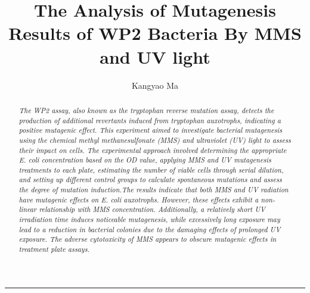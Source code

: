 \documentclass[a4paper,10pt]{article}
\title{\bfseries The Analysis of Mutagenesis Results of WP2 Bacteria By MMS and UV light}
\author{Kangyao Ma}
\date{}
\begin{document}
\maketitle


\setlength{\absleftindent}{0pt}
\setlength{\absrightindent}{0pt}
\setlength{\abstitleskip}{-1.5em}
\abslabeldelim{:}
\renewcommand{\abstractnamefont}{\itshape\bfseries}
\renewcommand{\absnamepos}{flushleft}
\begin{abstract}
\textit{\small The WP2 assay, also known as the tryptophan reverse mutation assay, detects the production of additional revertants induced from tryptophan auxotrophs, indicating a positive mutagenic effect. This experiment aimed to investigate bacterial mutagenesis using the chemical methyl methanesulfonate (MMS) and ultraviolet (UV) light to assess their impact on cells. The experimental approach involved determining the appropriate E. coli concentration based on the OD value, applying MMS and UV mutagenesis treatments to each plate, estimating the number of viable cells through serial dilution, and setting up different control groups to calculate spontaneous mutations and assess the degree of mutation induction.The results indicate that both MMS and UV radiation have mutagenic effects on E. coli auxotrophs. However, these effects exhibit a non-linear relationship with MMS concentration. Additionally, a relatively short UV irradiation time induces noticeable mutagenesis, while excessively long exposure may lead to a reduction in bacterial colonies due to the damaging effects of prolonged UV exposure. The adverse cytotoxicity of MMS appears to obscure mutagenic effects in treatment plate assays.}
\end{abstract}


\hrule
\end{document}

